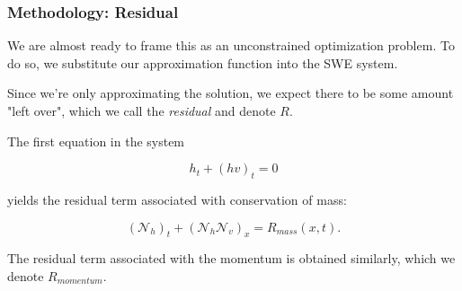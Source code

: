 \begin{frame}
    \frametitle{Methodology: Residual}

    We are almost ready to frame this as an unconstrained optimization problem. To do so, we substitute our approximation 
    function into the SWE system. 

    \bigskip
    \pause

    Since we're only approximating the solution, we expect there to be some amount "left over", which we call the 
    \textit{residual} and denote $R$. 
    
    \bigskip
    \pause

    The first equation in the system 
    
    $$
    h_t + (hv)_t = 0
    $$
    
    yields the residual term associated with conservation of mass:

    $$
    \left( \mathcal{N}_h \right)_t + \left( \mathcal{N}_h \mathcal{N}_v \right)_x = R_{mass}(x, t).
    $$

    \bigskip
    \pause

    The residual term associated with the momentum is obtained similarly, which we denote $R_{momentum}$.
\end{frame}